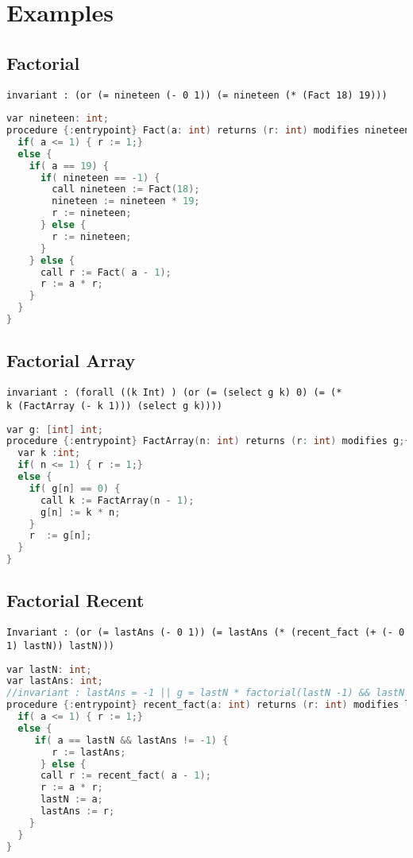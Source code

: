 \section{Examples}

\subsection{Factorial}
\begin{verbatim}
invariant : (or (= nineteen (- 0 1)) (= nineteen (* (Fact 18) 19)))
\end{verbatim}
\begin{lstlisting}[language=c, caption= {Procedure `factorial' :
      returns factorial of `n' and memoizes result for argument value
      `19'.}, label=lst:fact19]
var nineteen: int;
procedure {:entrypoint} Fact(a: int) returns (r: int) modifies nineteen;{
  if( a <= 1) { r := 1;}
  else {
    if( a == 19) {
      if( nineteen == -1) {
        call nineteen := Fact(18);
        nineteen := nineteen * 19;
        r := nineteen;
      } else {
        r := nineteen;
      }
    } else {
      call r := Fact( a - 1);
      r := a * r;
    }
  }
}
\end{lstlisting}

\subsection{Factorial Array}
\begin{verbatim}
invariant : (forall ((k Int) ) (or (= (select g k) 0) (= (*
k (FactArray (- k 1))) (select g k))))
\end{verbatim}
\begin{lstlisting}[language=c, caption= {Procedure `FactArray' cache result for each argument value greater than 1}, label=lst:factArrayImpl]
var g: [int] int;
procedure {:entrypoint} FactArray(n: int) returns (r: int) modifies g;{
  var k :int;
  if( n <= 1) { r := 1;}
  else {
    if( g[n] == 0) {
      call k := FactArray(n - 1);
      g[n] := k * n;
    } 
    r  := g[n];
  }
}
\end{lstlisting}

\subsection{Factorial Recent}
\begin{verbatim}
Invariant : (or (= lastAns (- 0 1)) (= lastAns (* (recent_fact (+ (- 0 1) lastN)) lastN)))
\end{verbatim}
\begin{lstlisting}[language=c, caption= {Procedure `recent\_fact' :
      returns factorial of `n' and memoizes result for the last argument value.}, label=lst:factorialRecent]
var lastN: int;
var lastAns: int;
//invariant : lastAns = -1 || g = lastN * factorial(lastN -1) && lastN >1 
procedure {:entrypoint} recent_fact(a: int) returns (r: int) modifies lastN, lastAns;{
  if( a <= 1) { r := 1;}
  else {
     if( a == lastN && lastAns != -1) {
        r := lastAns;
      } else {
      call r := recent_fact( a - 1);    
      r := a * r;
      lastN := a;
      lastAns := r;
    }
  }
}
\end{lstlisting}

